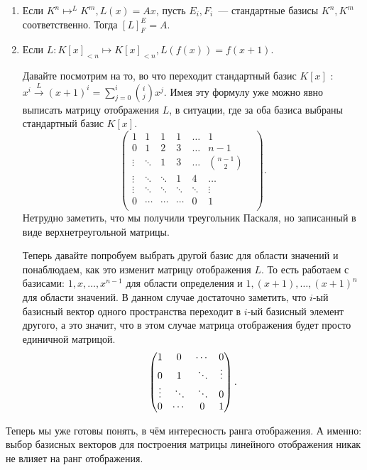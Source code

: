 \begin{examples}
    \begin{enumerate}
        \item
            Если $K^n\mapsto^{L} K^m, L(x) = Ax$, пусть $E_i, F_i$~--- стандартные базисы $K^n, K^m$
            соответственно.
            Тогда $[L]^E_F = A$.
        \item
            Если $L: K[x]_{<n}\mapsto K[x]_{<n}, L(f(x)) = f(x + 1)$.
            
            Давайте посмотрим на то, во что переходит стандартный базис $K[x]$ :
            $x^i\xrightarrow{L}(x+1)^i = \sum\limits_{j=0}^{i}{\binom{i}{j}x^j}$.
            Имея эту формулу уже можно явно выписать матрицу отображения $L$,
            в ситуации, где за оба базиса выбраны стандартный базис $K[x]$.
            \[
            \begin{pmatrix}
                1&1&1&1&\dots&1\\
                0&1&2&3&\dots&n-1\\
                \vdots&\ddots&1&3&\dots&\binom{n-1}{2}\\
                \vdots&\ddots&\ddots&1&4&\dots&\\
                \vdots&\ddots&\ddots&\ddots&\ddots&\vdots\\
                0&\cdots&\cdots&\cdots&0&1\\
            \end{pmatrix}
        .\] 
        Нетрудно заметить, что мы получили треугольник Паскаля, но записанный в виде 
        верхнетреугольной матрицы.

        Теперь давайте попробуем выбрать другой базис для области значений и понаблюдаем,
        как это изменит матрицу отображения $L$. То есть работаем с базисами:
        $1, x,\dots, x^{n-1}$ для области определения и $1,(x + 1), \dots, (x+1)^n$ для
        области значений.  В данном случае достаточно заметить, что $i$-ый базисный
        вектор одного пространства переходит в $i$-ый базисный элемент другого, а это
        значит, что в этом случае матрица отображения будет просто единичной матрицой.
        \[
        \begin{pmatrix}
            1&0&\cdots&0\\
            0&1&\rotatebox{140}{\ldots}&\vdots\\
            \vdots&\rotatebox{140}{\ldots}&\rotatebox{140}{\ldots}&0\\
            0&\cdots&0&1\\
        \end{pmatrix}
        .\] 
    \end{enumerate}
\end{examples}
\begin{remark}
    Теперь мы уже готовы понять, в чём интересность ранга отображения.
    А именно: выбор базисных векторов для построения матрицы линейного отображения
    никак не влияет на ранг отображения.
\end{remark}
